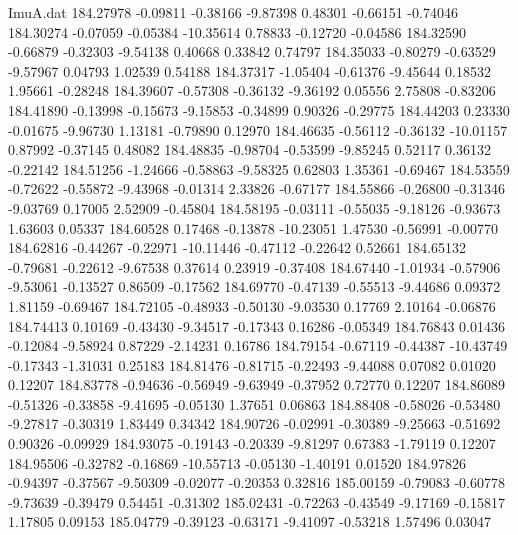 \begin{filecontents}{ImuA.dat}
 184.27978   -0.09811   -0.38166   -9.87398    0.48301   -0.66151   -0.74046
 184.30274   -0.07059   -0.05384  -10.35614    0.78833   -0.12720   -0.04586
 184.32590   -0.66879   -0.32303   -9.54138    0.40668    0.33842    0.74797
 184.35033   -0.80279   -0.63529   -9.57967    0.04793    1.02539    0.54188
 184.37317   -1.05404   -0.61376   -9.45644    0.18532    1.95661   -0.28248
 184.39607   -0.57308   -0.36132   -9.36192    0.05556    2.75808   -0.83206
 184.41890   -0.13998   -0.15673   -9.15853   -0.34899    0.90326   -0.29775
 184.44203    0.23330   -0.01675   -9.96730    1.13181   -0.79890    0.12970
 184.46635   -0.56112   -0.36132  -10.01157    0.87992   -0.37145    0.48082
 184.48835   -0.98704   -0.53599   -9.85245    0.52117    0.36132   -0.22142
 184.51256   -1.24666   -0.58863   -9.58325    0.62803    1.35361   -0.69467
 184.53559   -0.72622   -0.55872   -9.43968   -0.01314    2.33826   -0.67177
 184.55866   -0.26800   -0.31346   -9.03769    0.17005    2.52909   -0.45804
 184.58195   -0.03111   -0.55035   -9.18126   -0.93673    1.63603    0.05337
 184.60528    0.17468   -0.13878  -10.23051    1.47530   -0.56991   -0.00770
 184.62816   -0.44267   -0.22971  -10.11446   -0.47112   -0.22642    0.52661
 184.65132   -0.79681   -0.22612   -9.67538    0.37614    0.23919   -0.37408
 184.67440   -1.01934   -0.57906   -9.53061   -0.13527    0.86509   -0.17562
 184.69770   -0.47139   -0.55513   -9.44686    0.09372    1.81159   -0.69467
 184.72105   -0.48933   -0.50130   -9.03530    0.17769    2.10164   -0.06876
 184.74413    0.10169   -0.43430   -9.34517   -0.17343    0.16286   -0.05349
 184.76843    0.01436   -0.12084   -9.58924    0.87229   -2.14231    0.16786
 184.79154   -0.67119   -0.44387  -10.43749   -0.17343   -1.31031    0.25183
 184.81476   -0.81715   -0.22493   -9.44088    0.07082    0.01020    0.12207
 184.83778   -0.94636   -0.56949   -9.63949   -0.37952    0.72770    0.12207
 184.86089   -0.51326   -0.33858   -9.41695   -0.05130    1.37651    0.06863
 184.88408   -0.58026   -0.53480   -9.27817   -0.30319    1.83449    0.34342
 184.90726   -0.02991   -0.30389   -9.25663   -0.51692    0.90326   -0.09929
 184.93075   -0.19143   -0.20339   -9.81297    0.67383   -1.79119    0.12207
 184.95506   -0.32782   -0.16869  -10.55713   -0.05130   -1.40191    0.01520
 184.97826   -0.94397   -0.37567   -9.50309   -0.02077   -0.20353    0.32816
 185.00159   -0.79083   -0.60778   -9.73639   -0.39479    0.54451   -0.31302
 185.02431   -0.72263   -0.43549   -9.17169   -0.15817    1.17805    0.09153
 185.04779   -0.39123   -0.63171   -9.41097   -0.53218    1.57496    0.03047

\end{filecontents}
